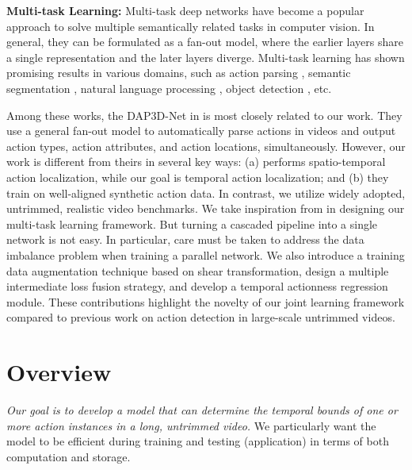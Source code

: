 \documentclass[10pt,twocolumn,letterpaper]{article}
\begin{document}
\noindent \textbf{Multi-task Learning:} Multi-task deep networks have become a popular approach to solve multiple semantically related tasks in computer vision. In general, they can be formulated as a fan-out model, where the earlier layers share a single representation and the later layers diverge. 
Multi-task learning has shown promising results in various domains, such as action parsing \cite{DAP3D2016}, semantic segmentation \cite{segment_multitask_cvpr16_dai}, natural language processing \cite{seq2seq_multitask_iclr16_luong}, object detection \cite{object_multitask_iccv15_ghifary}, etc.

Among these works, the DAP3D-Net in \cite{DAP3D2016} is most closely related to our work. They use a general fan-out model to automatically parse actions in videos and  output action types, action attributes, and action locations, simultaneously. However, our work is different from theirs in several key ways: (a) \cite{DAP3D2016} performs spatio-temporal action localization, while our goal is temporal action localization; and (b) they train on well-aligned synthetic action data. In contrast, we utilize widely adopted, untrimmed, realistic video benchmarks.
We take inspiration from \cite{scnn_shou_wang_chang_cvpr16} in designing our multi-task learning framework. But turning a cascaded pipeline into a single network is not easy. In particular, care must be taken to address the data imbalance problem when training a parallel network. 
We also introduce a training data augmentation technique based on shear transformation, design a multiple intermediate loss fusion strategy, and develop a temporal actionness regression module. These contributions highlight the novelty of our joint learning framework compared to previous work on action detection in large-scale untrimmed videos.

\section{Overview}
\label{sec:overview}
\textit{Our goal is to develop a model that can determine the temporal bounds of one or more action instances in a long, untrimmed video.} We particularly want the model to be efficient during training and testing (application) in terms of both computation and storage.
\end{document}
